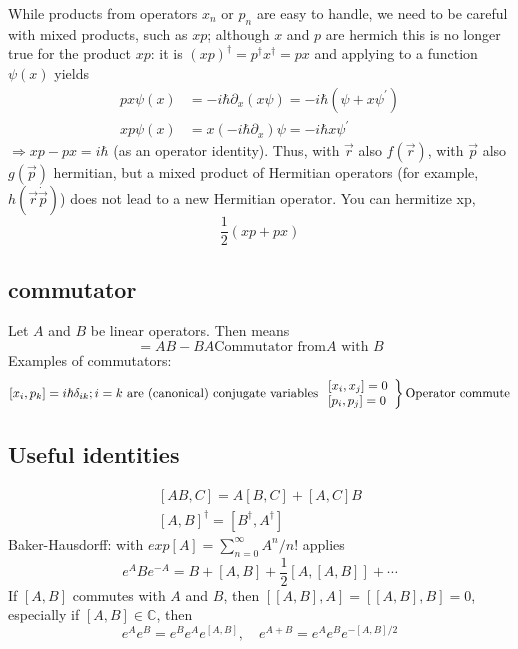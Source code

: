 While products from operators $x_n$ or $p_n$ are easy to handle, we need to be careful with mixed products, such as $xp$; although $x$ and $p$ are hermich this is no longer true for the product $xp$: it is $(xp)^{\dagger}=p^{\dagger}x^{\dagger}=px$ and applying to a function $\psi(x)$ yields
\begin{equation}
\begin{aligned} p x \psi(x) &=-i \hbar \partial_{x}(x \psi)=-i \hbar\left(\psi+x \psi^{\prime}\right) \\ x p \psi(x) &=x\left(-i \hbar \partial_{x}\right) \psi=-i \hbar x \psi^{\prime} \end{aligned}
\end{equation}
$\Rightarrow xp-px=i\hbar$ (as an operator identity). Thus, with $\vec{r}$ also $f(\vec{r})$, with $\vec{p}$ also $g(\vec{p})$ hermitian, but a mixed product of Hermitian operators (for example, $h(\vec{r}\dot\vec{p})$) does not lead to a new Hermitian operator. You can hermitize xp,
\begin{equation}
    \frac{1}{2}(xp+px)
\end{equation}

\subsection{commutator}
Let $A$ and $B$ be linear operators. Then means
\begin{equation}
    [A,B]=AB-BA \text{Commutator from} A \text{ with } B
\end{equation}
Examples of commutators:
$$
    [x_i,p_k]=i\hbar \delta_{ik}; \\i=k \text{ are (canonical) conjugate variables}\\
    \left.
    \begin{array}{l}{\left[x_{i}, x_{j}\right]=0} \\ {\left[p_{i}, p_{j}\right]=0}
    \end{array}\right\}\text{Operator commute}
$$
\subsection{Useful identities}
\begin{equation}
\begin{array}{l}{[A B, C]=A[B, C]+[A, C] B} \\ {[A, B]^{\dagger}=\left[B^{\dagger}, A^{\dagger}\right]}\end{array}
\end{equation}
Baker-Hausdorff: with $exp[A]=\sum^{\infty}_{n=0}A^n/n!$ applies
\begin{equation}
    e^{A} B e^{-A}=B+[A, B]+\frac{1}{2}[A,[A, B]]+\cdots
    \end{equation}
If $[A, B]$ commutes with $A$ and $B$, then $[[A, B], A] = [[A, B], B] = 0$, especially if $[A, B] \in \mathbb{C}$, then
\begin{equation}
    e^{A} e^{B}=e^{B} e^{A} e^{[A, B]}, \quad e^{A+B}=e^{A} e^{B} e^{-[A, B] / 2}
    \end{equation}
